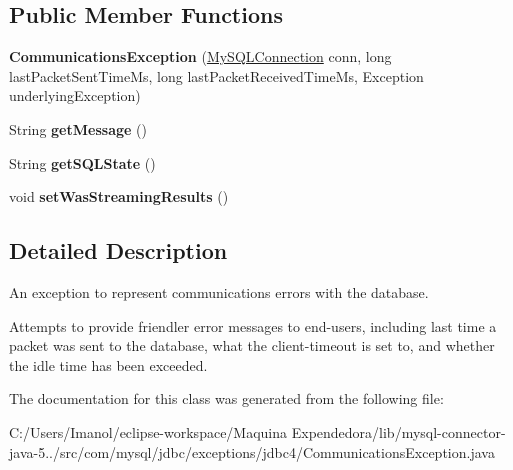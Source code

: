 \subsection*{Public Member Functions}
\begin{DoxyCompactItemize}
\item 
\mbox{\label{classcom_1_1mysql_1_1jdbc_1_1exceptions_1_1jdbc4_1_1_communications_exception_a0e09a3362dce19e76fc1760e41b8d1ba}} 
{\bfseries Communications\+Exception} (\mbox{\hyperlink{interfacecom_1_1mysql_1_1jdbc_1_1_my_s_q_l_connection}{My\+S\+Q\+L\+Connection}} conn, long last\+Packet\+Sent\+Time\+Ms, long last\+Packet\+Received\+Time\+Ms, Exception underlying\+Exception)
\item 
\mbox{\label{classcom_1_1mysql_1_1jdbc_1_1exceptions_1_1jdbc4_1_1_communications_exception_a397a17b4fce3a9b9175bcc55753eba2a}} 
String {\bfseries get\+Message} ()
\item 
\mbox{\label{classcom_1_1mysql_1_1jdbc_1_1exceptions_1_1jdbc4_1_1_communications_exception_a7a493684c7535bc7e1ef8c512aa60b76}} 
String {\bfseries get\+S\+Q\+L\+State} ()
\item 
\mbox{\label{classcom_1_1mysql_1_1jdbc_1_1exceptions_1_1jdbc4_1_1_communications_exception_a044609b545d4056cfa3e3d3892ff923c}} 
void {\bfseries set\+Was\+Streaming\+Results} ()
\end{DoxyCompactItemize}


\subsection{Detailed Description}
An exception to represent communications errors with the database.

Attempts to provide \textquotesingle{}friendler\textquotesingle{} error messages to end-\/users, including last time a packet was sent to the database, what the client-\/timeout is set to, and whether the idle time has been exceeded. 

The documentation for this class was generated from the following file\+:\begin{DoxyCompactItemize}
\item 
C\+:/\+Users/\+Imanol/eclipse-\/workspace/\+Maquina Expendedora/lib/mysql-\/connector-\/java-\/5../src/com/mysql/jdbc/exceptions/jdbc4/Communications\+Exception.\+java\end{DoxyCompactItemize}

